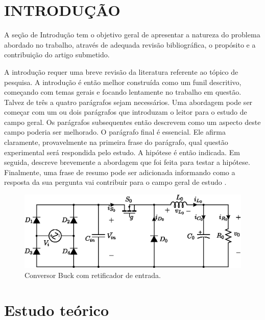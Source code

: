 %


\section{INTRODUÇÃO}


A seção de Introdução tem o objetivo geral de apresentar a natureza do problema abordado no trabalho, através de adequada revisão bibliográfica, o propósito e a contribuição do artigo submetido.

A introdução requer uma breve revisão da literatura referente ao tópico de pesquisa. A introdução é então melhor construída como um funil descritivo, começando com temas gerais e focando lentamente no trabalho em questão. Talvez de três a quatro parágrafos sejam necessários. Uma abordagem pode ser começar com um ou dois parágrafos que introduzam o leitor para o estudo de campo geral. Os parágrafos subsequentes então descrevem como um aspecto deste campo poderia ser melhorado. O parágrafo final é essencial. Ele afirma claramente, provavelmente na primeira frase do parágrafo, qual questão experimental será respondida pelo estudo. A hipótese é então indicada. Em seguida, descreve brevemente a abordagem que foi feita para testar a hipótese. Finalmente, uma frase de resumo pode ser adicionada informando como a resposta da sua pergunta vai contribuir para o campo geral de estudo .

\begin{figure}[!h]
	\centering
	\includegraphics[width=1\linewidth]{Figs/RET-Buck}
	\caption{Conversor Buck com retificador de entrada.}
	\label{fig:ret-buck}
\end{figure}



\section{Estudo teórico}

